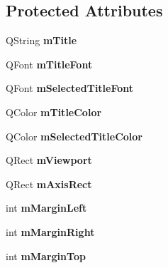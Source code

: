 \subsection*{Protected Attributes}
\begin{DoxyCompactItemize}
\item 
\hypertarget{classQCustomPlot_a7ff92cd30a25ecc4db923b535910c7be}{Q\-String {\bfseries m\-Title}}\label{classQCustomPlot_a7ff92cd30a25ecc4db923b535910c7be}

\item 
\hypertarget{classQCustomPlot_a127950967ada049b61eea4c2bed3f4ee}{Q\-Font {\bfseries m\-Title\-Font}}\label{classQCustomPlot_a127950967ada049b61eea4c2bed3f4ee}

\item 
\hypertarget{classQCustomPlot_a43f7478911c74a3788b6c8f02f1eb4bc}{Q\-Font {\bfseries m\-Selected\-Title\-Font}}\label{classQCustomPlot_a43f7478911c74a3788b6c8f02f1eb4bc}

\item 
\hypertarget{classQCustomPlot_a94b15b3356760d19487c0d1baeb37d4a}{Q\-Color {\bfseries m\-Title\-Color}}\label{classQCustomPlot_a94b15b3356760d19487c0d1baeb37d4a}

\item 
\hypertarget{classQCustomPlot_a62488fc0f570567eb7b0633a46fe4e80}{Q\-Color {\bfseries m\-Selected\-Title\-Color}}\label{classQCustomPlot_a62488fc0f570567eb7b0633a46fe4e80}

\item 
\hypertarget{classQCustomPlot_ac0a7c38a715526c257cff95774f83ab6}{Q\-Rect {\bfseries m\-Viewport}}\label{classQCustomPlot_ac0a7c38a715526c257cff95774f83ab6}

\item 
\hypertarget{classQCustomPlot_a0915ab4426899b5be2e29fac8a75a41c}{Q\-Rect {\bfseries m\-Axis\-Rect}}\label{classQCustomPlot_a0915ab4426899b5be2e29fac8a75a41c}

\item 
\hypertarget{classQCustomPlot_a21ca75784f7c026f7fbd5ecb1859e53a}{int {\bfseries m\-Margin\-Left}}\label{classQCustomPlot_a21ca75784f7c026f7fbd5ecb1859e53a}

\item 
\hypertarget{classQCustomPlot_a11ab3751e41bd84f80d39cd402d33b44}{int {\bfseries m\-Margin\-Right}}\label{classQCustomPlot_a11ab3751e41bd84f80d39cd402d33b44}

\item 
\hypertarget{classQCustomPlot_a8cbdb4fd979850a172d41816be8575a0}{int {\bfseries m\-Margin\-Top}}\label{classQCustomPlot_a8cbdb4fd979850a172d41816be8575a0}


\end{DoxyCompactItemize}
